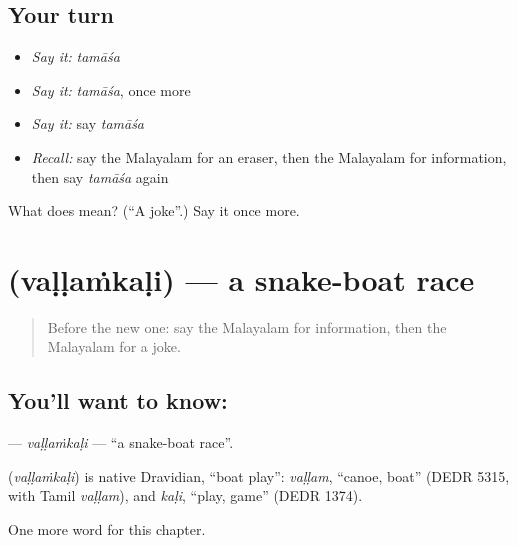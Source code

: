 \subsection*{Your turn}
\begin{itemize}
\raggedright
  \item \emph{Say it:} \emph{tamāśa}
  \item \emph{Say it:} \emph{tamāśa}, once more
  \item \emph{Say it:} say \emph{tamāśa}
  \item \emph{Recall:} say the Malayalam for an eraser, then the Malayalam for information, then say \emph{tamāśa} again
\end{itemize}

\begin{tcolorbox}[breakable,colback=teal!4,colframe=teal!35!black,title={Before you move on}]
What does  mean? (\textquotedblleft{}A joke\textquotedblright{}.) Say it once more.
\end{tcolorbox}
\section[\texorpdfstring{\ml{വള്ളംകളി} (vaḷḷaṁkaḷi)}{വള്ളംകളി (vaḷḷaṁkaḷi)}]{ (vaḷḷaṁkaḷi) — a snake-boat race}

\label{lesson:ML-C252-vallamkali}



\begin{quote}
Before the new one: say the Malayalam for information, then the Malayalam for a joke.
\end{quote}

\subsection*{You'll want to know: }
\textbf{} — \emph{vaḷḷaṁkaḷi} — \textquotedblleft{}a snake-boat race\textquotedblright{}.

\begin{cousinweb}
\textbf{} (\emph{vaḷḷaṁkaḷi}) is native Dravidian, \textquotedblleft{}boat play\textquotedblright{}: \emph{vaḷḷam}, \textquotedblleft{}canoe, boat\textquotedblright{} (DEDR 5315, with Tamil \emph{vaḷḷam}), and \emph{kaḷi}, \textquotedblleft{}play, game\textquotedblright{} (DEDR 1374).
\end{cousinweb}

\begin{grammarlens}[title={What you've built}]
One more word for this chapter.
\end{grammarlens}

